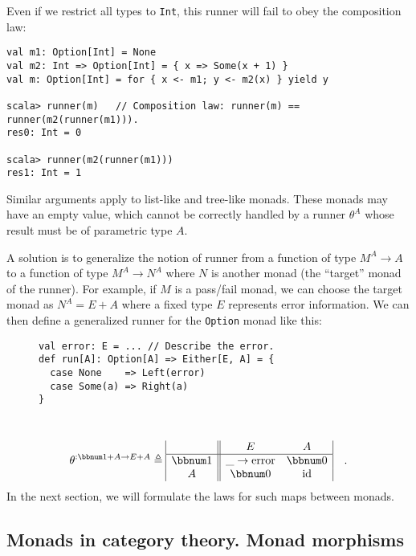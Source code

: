 Even if we restrict all types to \lstinline!Int!, this runner will
fail to obey the composition law:
\begin{lstlisting}
val m1: Option[Int] = None
val m2: Int => Option[Int] = { x => Some(x + 1) }
val m: Option[Int] = for { x <- m1; y <- m2(x) } yield y

scala> runner(m)   // Composition law: runner(m) == runner(m2(runner(m1))).
res0: Int = 0

scala> runner(m2(runner(m1)))
res1: Int = 1
\end{lstlisting}
Similar arguments apply to list-like and tree-like monads. These monads
may have an empty value, which cannot be correctly handled by a runner
$\theta^{A}$ whose result must be of parametric type $A$. 

A solution is to generalize the notion of runner from a function of
type $M^{A}\rightarrow A$ to a function of type $M^{A}\rightarrow N^{A}$
where $N$ is another monad (the \textsf{``}target\textsf{''} monad of the runner).
For example, if $M$ is a pass/fail monad, we can choose the target
monad as $N^{A}=E+A$ where a fixed type $E$ represents error information.
We can then define a generalized runner for the \lstinline!Option!
monad like this:

\begin{wrapfigure}{l}{0.43\columnwidth}%
\vspace{-0.85\baselineskip}

\begin{lstlisting}
val error: E = ... // Describe the error.
def run[A]: Option[A] => Either[E, A] = {
  case None    => Left(error)
  case Some(a) => Right(a)
}
\end{lstlisting}
\vspace{-2.2\baselineskip}
\end{wrapfigure}%

~\vspace{-0.2\baselineskip}
\[
\theta^{:\bbnum 1+A\rightarrow E+A}\triangleq\begin{array}{|c||cc|}
 & E & A\\
\hline \bbnum 1 & \_\rightarrow\text{error} & \bbnum 0\\
A & \bbnum 0 & \text{id}
\end{array}\quad.
\]
In the next section, we will formulate the laws for such maps between
monads.

\subsection{Monads in category theory. Monad morphisms\label{subsec:Monads-in-category-theory-monad-morphisms}}

